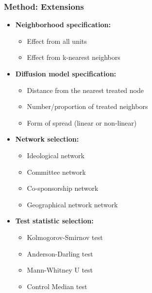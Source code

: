 \documentclass{beamer}
\begin{document}
\begin{frame}
\frametitle{Method: Extensions}


	\begin{itemize}
	
	\item \textbf{Neighborhood specification:}
		\begin{itemize}
		\item Effect from all units
		\item Effect from k-nearest neighbors 
		\end{itemize}
		
	\item \textbf{Diffusion model specification:}
		\begin{itemize}
		\item Distance from the nearest treated node
		\item Number/proportion of treated neighbors
		\item Form of spread (linear or non-linear)
		\end{itemize}

	\item \textbf{Network selection:}
		\begin{itemize}
		\item Ideological network
		\item Committee network
		\item Co-sponsorship network
		\item Geographical network network
		\end{itemize}
					
	\item \textbf{Test statistic selection:}
		\begin{itemize}
		\item Kolmogorov-Smirnov test
		\item Anderson-Darling test
		\item Mann-Whitney U test
		\item Control Median test
		\end{itemize}
	\end{itemize}

\end{frame}
\end{document}
